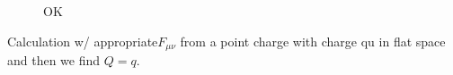 \documentclass[10pt]{article}
\begin{document}
\begin{figure}[h]
\begin{center}
\begin{tikzpicture}[x=0.75pt,y=0.75pt,yscale=-1,xscale=1]
\end{tikzpicture}

\end{center}
\caption{OK}
\end{figure}

Calculation w/ appropriate$ F_{\mu \nu}$ from a point charge with charge qu in flat space and then we find $Q=q$. 
\end{document}
